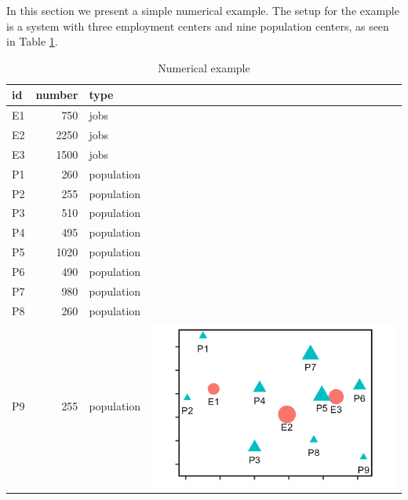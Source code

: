 \documentclass[]{elsarticle} %
\begin{document}
In this section we present a simple numerical example. The setup for the
example is a system with three employment centers and nine population
centers, as seen in Table \ref{tab:toy-example}.

\begin{table}

\caption{\label{tab:toy-example-table}\label{tab:toy-example}Numerical example}
\centering
\begin{tabular}[t]{lrl>{}l}
\toprule
id & number & type & \\
\midrule
E1 & 750 & jobs & \\

E2 & 2250 & jobs & \\

E3 & 1500 & jobs & \\

P1 & 260 & population & \\

P2 & 255 & population & \\

P3 & 510 & population & \\

P4 & 495 & population & \\

P5 & 1020 & population & \\

P6 & 490 & population & \\

P7 & 980 & population & \\

P8 & 260 & population & \\

P9 & 255 & population & \multirow{-12}{*}{\raggedright\arraybackslash \includegraphics{images/figure-1.png}}\\
\bottomrule
\end{tabular}
\end{table}
\end{document}
